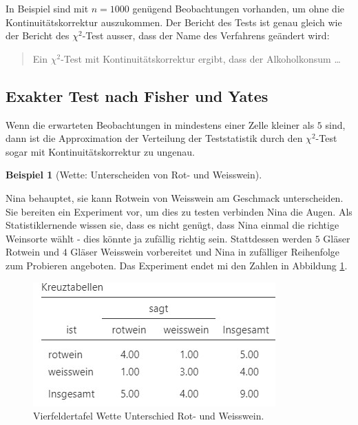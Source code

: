 \documentclass[
]{book}
\theoremstyle{definition}
\theoremstyle{definition}
\newtheorem{example}{Beispiel}[chapter]
\theoremstyle{definition}
\theoremstyle{definition}
\theoremstyle{remark}
\begin{document}
In Beispiel sind mit \(n = 1000\) genügend Beobachtungen vorhanden, um
ohne die Kontinuitätskorrektur auszukommen. Der Bericht des Tests ist
genau gleich wie der Bericht des \(\chi^2\)-Test ausser, dass der Name des
Verfahrens geändert wird:

\begin{quote}
Ein \(\chi^2\)-Test mit Kontinuitätskorrektur ergibt, dass der
Alkoholkonsum \ldots{}
\end{quote}

\subsection{Exakter Test nach Fisher und Yates}\label{exakter-test-nach-fisher-und-yates}

Wenn die erwarteten Beobachtungen in mindestens einer Zelle kleiner als
\(5\) sind, dann ist die Approximation der Verteilung der Teststatistik
durch den \(\chi^2\)-Test sogar mit Kontinuitätskorrektur zu ungenau.

\begin{example}[Wette: Unterscheiden von Rot- und Weisswein]
\protect\hypertarget{exm:red-white-wine}{}\label{exm:red-white-wine}

Nina behauptet, sie kann Rotwein von Weisswein am Geschmack
unterscheiden. Sie bereiten ein Experiment vor, um dies zu testen
verbinden Nina die Augen. Als Statistiklernende wissen sie, dass es
nicht genügt, dass Nina einmal die richtige Weinsorte wählt - dies
könnte ja zufällig richtig sein. Stattdessen werden \(5\) Gläser Rotwein
und \(4\) Gläser Weisswein vorbereitet und Nina in zufälliger Reihenfolge
zum Probieren angeboten. Das Experiment endet mi den Zahlen in Abbildung
\ref{fig:exm-red-white-wine-aggdata-view}.

\begin{figure}

{\centering \includegraphics{figures/09-exm-red-white-wine-aggdata-view} 

}

\caption{Vierfeldertafel Wette Unterschied Rot- und Weisswein.}\label{fig:exm-red-white-wine-aggdata-view}
\end{figure}

\end{example}
\end{document}
